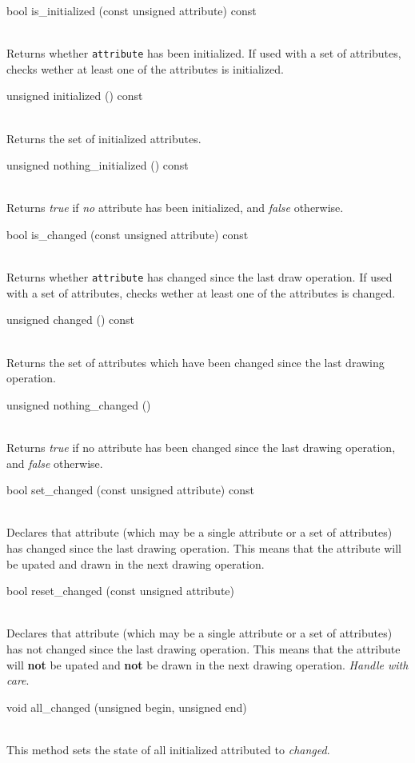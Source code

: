 \documentclass[twoside,fleqn]{report}
\begin{document}
\begin{Cdefinition}
  
  \item[bool is\_initialized (const unsigned attribute) const] \strut\\
  Returns whether \texttt{attribute} has been initialized.  If
  used with a set of attributes, checks wether at least one of
  the attributes is initialized.
  
  \item[unsigned initialized () const] \strut\\
  Returns the set of initialized attributes.

  \item[unsigned nothing\_initialized () const] \strut\\
  Returns \emph{true} if \emph{no} attribute has been
  initialized, and \emph{false} otherwise.
  
  \item[bool is\_changed (const unsigned attribute) const] \strut\\ 
  Returns whether \texttt{attribute} has changed since the last draw 
  operation.  If used with a set of attributes, checks wether at least 
  one of the attributes is changed.

  \item[unsigned changed () const] \strut\\
  Returns the set of attributes which have been changed since the 
  last drawing operation.

  \item[unsigned nothing\_changed ()] \strut\\
  Returns \emph{true} if no attribute has been changed since 
  the last drawing operation, and \emph{false} otherwise.
  
  \item[bool set\_changed (const unsigned attribute) const] \strut\\
  Declares that attribute (which may be a single attribute or a
  set of attributes) has changed since the last drawing
  operation. This means that the attribute will be upated and
  drawn in the next drawing operation.
   
  \item[bool reset\_changed (const unsigned attribute)] \strut\\
  Declares that attribute (which may be a single attribute or a
  set of attributes) has not changed since the last drawing
  operation.  This means that the attribute will \textbf{not} be
  upated and \textbf{not} be drawn in the next drawing operation.
  \emph{Handle with care}.
  
  \item[void all\_changed (unsigned begin, unsigned end)] \strut\\
  This method sets the state of all initialized attributed to
  \emph{changed}.

\end{Cdefinition}
\end{document}
